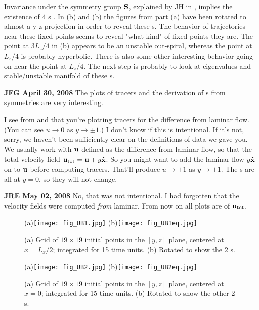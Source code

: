 Invariance under the symmetry group $\bf S$, explained by JH in
, implies the existence of 4 \stagp s
.
In (b) and (b) the figures
from part (a) have been rotated to almost a y-z projection in order
to reveal these \stagp s. The behavior of trajectories near these
fixed points seems to reveal "what kind" of fixed points they are.
The point at $3L_z/4$ in (b) appears to be an
unstable out-spiral, whereas the point at $L_z/4$ is probably hyperbolic.
There is also some other interesting behavior going on near the
point at $L_z/4$. The next step is probably to look at eigenvalues and
stable/unstable manifold of these \stagp s.



    {\bf JFG April 30, 2008} The plots of tracers and the derivation of
\stagp s from symmetries are very interesting.

I see from  and  that
you're plotting tracers for the difference from laminar flow. (You
can see $u \rightarrow 0$ as $y \rightarrow \pm 1$.) I don't know if
this is intentional. If it's not, sorry, we haven't been
sufficiently clear on the definitions of data we gave you. We
usually work with ${\bf u}$ defined as the difference from laminar flow,
so that the total velocity field ${\bf u}_\text{tot} = {\bf u} + y {\bf
\hat{x}}$. So you might want to add the laminar flow  $y {\bf
\hat{x}}$ on to ${\bf u}$ before computing tracers. That'll produce $u
\rightarrow \pm 1$ as $y \rightarrow \pm 1$. The \stagp s are all
at $y=0$, so they will not change.

{\bf JRE May 02, 2008} No, that was not intentional. I had forgotten
that the velocity fields were computed \emph{from} laminar. From now
on all plots are of ${\bf u}_\text{tot}$.


\begin{center}
\begin{figure}[!h]
(a)\texttt{[image: fig\_UB1.jpg]}
(b)\texttt{[image: fig\_UB1eq.jpg]}
  \caption{
  (a) {Grid of $19 \times 19$  initial points in the $[y,z]$ plane,
centered at $x = L_x/2$; integrated for 15 time units.}
    (b) { Rotated to show the 2 \stagp s}.
      }
  \label{eltonFig:UBs}
 \end{figure}

 \begin{figure}[!h]
(a)\texttt{[image: fig\_UB2.jpg]}
(b)\texttt{[image: fig\_UB2eq.jpg]}
  \caption{
  (a) {Grid of $19 \times 19$ initial points in the $[y,z]$ plane,
centered at $x = 0$; integrated for 15 time units.}
  (b) { Rotated to show the other 2 \stagp s}.
         }
  \label{eltonFig:UBw}
 \end{figure}
\end{center}



